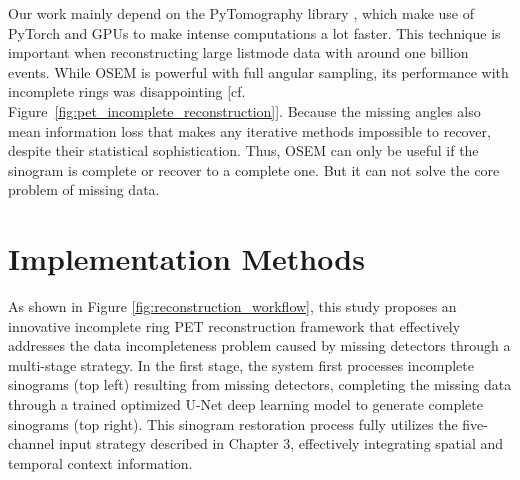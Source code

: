 \documentclass[12pt]{iopart}
\begin{document}
Our work mainly depend on the PyTomography library \cite{POLSON2025102020}, which make use of PyTorch and GPUs to make intense computations a lot faster. This technique is important when reconstructing large listmode data with around one billion events.
While OSEM is powerful with full angular sampling, its performance with incomplete rings was disappointing [cf. Figure~\ref{fig:pet_incomplete_reconstruction}]. Because the missing angles also mean information loss that makes any iterative methods impossible to recover, despite their statistical sophistication. 
Thus, OSEM can only be useful if the sinogram is complete or recover to a complete one. But it can not solve the core problem of missing data.




\section{Implementation Methods}
\label{chap:methods}


As shown in Figure \ref{fig:reconstruction_workflow}, this study proposes an innovative incomplete ring PET reconstruction framework that effectively addresses the data incompleteness problem caused by missing detectors through a multi-stage strategy. In the first stage, the system first processes incomplete sinograms (top left) resulting from missing detectors, completing the missing data through a trained optimized U-Net deep learning model to generate complete sinograms (top right). This sinogram restoration process fully utilizes the five-channel input strategy described in Chapter 3, effectively integrating spatial and temporal context information.
\end{document}
